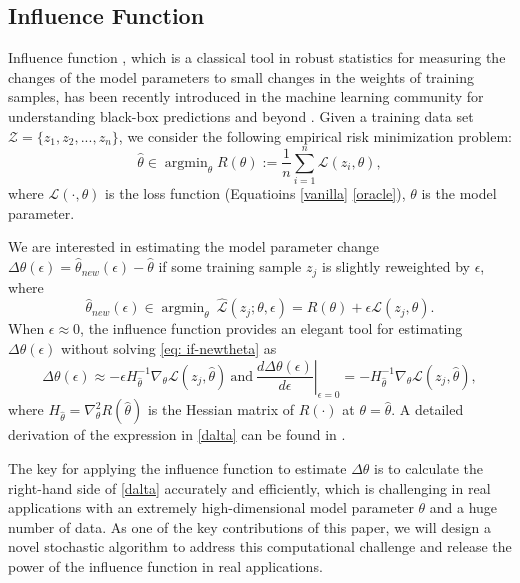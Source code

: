 \subsection{Influence Function} 
Influence function \cite{hampel1974influence}, which is a classical tool in robust statistics for measuring the changes of the model parameters to small changes in the weights of training samples, has been recently introduced in the machine learning community for understanding black-box predictions and beyond \cite{koh2017understanding}. Given a training data set $\mathcal{Z} = \{z_1, z_2, ..., z_n\}$, we consider the following empirical risk minimization problem:
\begin{equation}
\hat{\theta} \in \mathop{\arg\min}_{\theta} R(\theta) := \frac{1}{n} \sum_{i=1}^n \mathcal{L}\left(z_i, \theta\right),
\end{equation}
where $\mathcal{L}(\cdot, \theta)$ is the loss function (\eg Equatioins \eqref{vanilla} \eqref{oracle}), $\theta$ is the model parameter.

We are interested in estimating the model parameter change $\Delta\theta(\epsilon) = \hat{\theta}_{{new}}(\epsilon) - \hat{\theta}$ if some training sample $z_j$ is slightly reweighted by $\epsilon$, where
\begin{equation}
\label{eq: if-newtheta}
\hat{\theta}_{{new}}(\epsilon) \in \mathop{\arg\min}_{\theta} ~ \widehat{\mathcal{L}}(z_j; \theta, \epsilon) = R(\theta) + \epsilon\mathcal{L}(z_j, \theta).
\end{equation}
When $\epsilon \approx 0$, the influence function provides an elegant tool for estimating $\Delta\theta(\epsilon)$ without solving \eqref{eq: if-newtheta} as
\begin{equation}
\label{dalta}
\Delta \theta(\epsilon) \approx -\epsilon H_{\hat{\theta}}^{-1} \nabla_\theta \mathcal{L}(z_j, \hat{\theta}) ~\mbox{and}~ \left.\frac{d \Delta\theta(\epsilon)}{d \epsilon}\right|_{\epsilon=0} = -H_{\hat{\theta}}^{-1} \nabla_\theta \mathcal{L}(z_j, \hat{\theta}),
\end{equation}
where $H_{\hat{\theta}} = \nabla_\theta^2 R(\hat{\theta})$ is the Hessian matrix of $R(\cdot)$ at $\theta = \hat{\theta}$. A detailed derivation of the expression in \eqref{dalta} can be found in \cite{koh2017understanding}. 

The key for applying the influence function to estimate $\Delta\theta$ is to calculate the right-hand side of \eqref{dalta} accurately and efficiently, which is challenging in real applications with an extremely high-dimensional model parameter $\theta$ and a huge number of data. As one of the key contributions of this paper, we will design a novel stochastic algorithm to address this computational challenge and release the power of the influence function in real applications.


